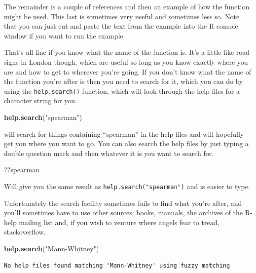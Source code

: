 \documentclass[
]{book}
\newenvironment{Shaded}{\begin{snugshade}}{\end{snugshade}}
\newcommand{\KeywordTok}[1]{\textcolor[rgb]{0.13,0.29,0.53}{\textbf{#1}}}
\newcommand{\NormalTok}[1]{#1}
\newcommand{\StringTok}[1]{\textcolor[rgb]{0.31,0.60,0.02}{#1}}
\begin{document}
The remainder is a couple of references and then an example of how the function might be used. This last is sometimes very useful and sometimes less so. Note that you can just cut and paste the text from the example into the R console window if you want to run the example.

That's all fine if you know what the name of the function is. It's a little like road signs in London though, which are useful so long as you know exactly where you are and how to get to wherever you're going. If you don't know what the name of the function you're after is then you need to search for it, which you can do by using the \texttt{help.search()} function, which will look through the help files for a character string for you.

\begin{Shaded}
\begin{Highlighting}[]
\KeywordTok{help.search}\NormalTok{(}\StringTok{"spearman"}\NormalTok{)}
\end{Highlighting}
\end{Shaded}

will search for things containing ``spearman'' in the help files and will hopefully get you where you want to go. You can also search the help files by just typing a double question mark and then whatever it is you want to search for.

\begin{Shaded}
\begin{Highlighting}[]
\NormalTok{??spearman}
\end{Highlighting}
\end{Shaded}

Will give you the same result as \texttt{help.search("spearman")} and is easier to type.

Unfortunately the search facility sometimes fails to find what you're after, and you'll sometimes have to use other sources: books, manuals, the archives of the R-help mailing list and, if you wish to venture where angels fear to tread, stackoverflow.

\begin{Shaded}
\begin{Highlighting}[]
\KeywordTok{help.search}\NormalTok{(}\StringTok{"Mann-Whitney"}\NormalTok{)}
\end{Highlighting}
\end{Shaded}

\begin{verbatim}
No help files found matching 'Mann-Whitney' using fuzzy matching
\end{verbatim}
\end{document}
